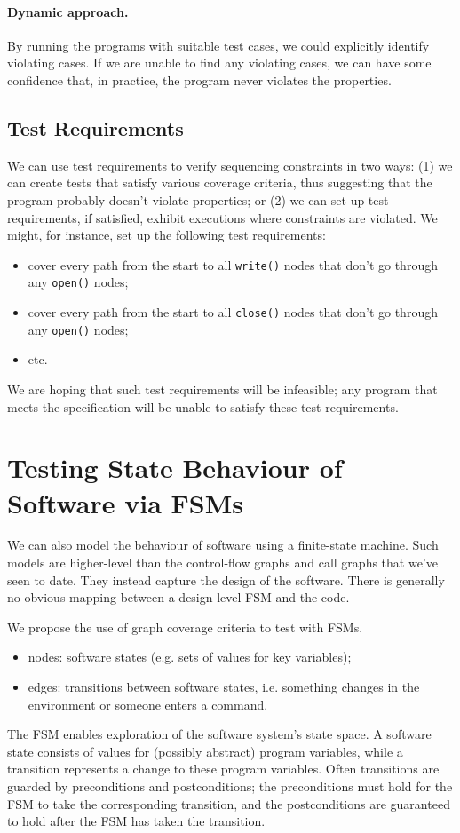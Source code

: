 \documentclass[11pt]{article}
\begin{document}
\paragraph{Dynamic approach.} By running the programs with suitable
test cases, we could explicitly identify violating cases. If we are
unable to find any violating cases, we can have some confidence that,
in practice, the program never violates the properties.

\subsection*{Test Requirements} We can use test requirements to verify 
sequencing constraints in two ways: (1) we can create tests that satisfy
various coverage criteria, thus suggesting that the program probably
doesn't violate properties; or (2) we can set up test requirements,
if satisfied, exhibit executions where constraints are violated.
We might,
for instance, set up the following test requirements:
\begin{itemize}
\item cover every path from the start to all {\tt write()} nodes that
don't go through any {\tt open()} nodes; 
\item cover every path from the start to all {\tt close()} nodes that
don't go through any {\tt open()} nodes;
\item etc.
\end{itemize}
We are hoping that such test requirements will be infeasible; any
program that meets the specification will be unable to satisfy these
test requirements.


\section*{Testing State Behaviour of Software via FSMs}

We can also model the behaviour of software using a finite-state
machine. Such models are higher-level than the control-flow graphs and
call graphs that we've seen to date. They instead capture the design
of the software. There is generally no obvious mapping between a
design-level FSM and the code.

We propose the use of graph coverage criteria to test with FSMs.
\begin{itemize}
\item nodes: software states (e.g. sets of values for key variables);
\item edges: transitions between software states, i.e. something changes
in the environment or someone enters a command.
\end{itemize}
The FSM enables exploration of the software system's state space.  A
software state consists of values for (possibly abstract) program
variables, while a transition represents a change to these program
variables. Often transitions are guarded by preconditions and
postconditions; the preconditions must hold for the FSM to take the
corresponding transition, and the postconditions are guaranteed to
hold after the FSM has taken the transition.
\end{document}
